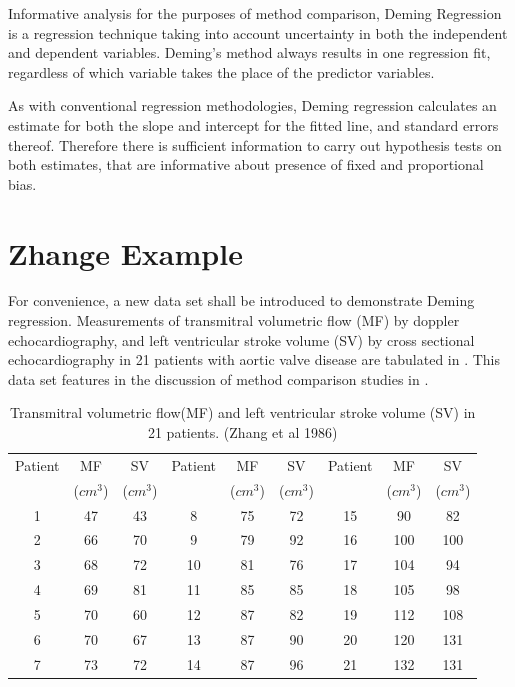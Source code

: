 \documentclass[12pt, a4paper]{report}
\theoremstyle{plain}
\theoremstyle{definition}
\theoremstyle{remark}
\begin{document}
Informative analysis for the purposes of method comparison, Deming Regression is a regression technique taking into account uncertainty in both the independent and dependent variables.
Deming’s method always results in one regression fit, regardless of which variable takes the place of the predictor variables.

As with conventional regression methodologies, Deming regression calculates an estimate for both the slope and intercept for the
fitted line, and standard errors thereof. Therefore there is sufficient information to carry out hypothesis tests on both
estimates, that are informative about presence of fixed and proportional bias.







\section{Zhange Example}

For convenience, a new data set shall be introduced to demonstrate
Deming regression. Measurements of transmitral volumetric flow
(MF) by doppler echocardiography, and left ventricular stroke
volume (SV) by cross sectional echocardiography in 21 patients
with aortic valve disease are tabulated in \citet{zhang}. This
data set features in the discussion of method comparison studies
in \citet[p.398]{AltmanBook} .


\begin{table}[h!]
	\begin{center}
		\begin{tabular}{|c|c|c||c|c|c||c|c|c|}
			\hline
			Patient & MF  & SV  & Patient & MF  & SV  & Patient & MF  & SV \\
			&($cm^{3}$)&  ($cm^{3}$) & &($cm^{3}$)&  ($cm^{3}$) & &($cm^{3}$)&  ($cm^{3}$)
			\\
			\hline
			1 & 47 & 43 &  8 & 75 & 72 &  15 & 90 & 82 \\
			2 & 66 & 70 & 9 & 79 & 92 &  16 & 100 & 100 \\
			3 & 68 & 72 & 10 & 81 & 76 & 17 & 104 & 94 \\
			4 & 69 & 81 & 11 & 85 & 85 &  18 & 105 & 98 \\
			5 & 70 & 60 & 12 & 87 & 82 & 19 & 112 & 108 \\
			6 & 70 & 67 & 13 & 87 & 90 & 20 & 120 & 131 \\
			7 & 73 & 72 & 14 & 87 & 96 &  21 & 132 & 131 \\
			
			\hline
		\end{tabular}
		\caption{Transmitral volumetric flow(MF) and left ventricular
			stroke volume (SV) in 21 patients. (Zhang et al 1986)}
	\end{center}
\end{table}
\end{document}
